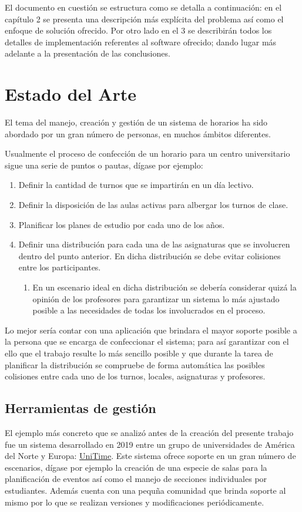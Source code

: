 El documento en cuestión se estructura como se detalla a continuación: en el capítulo 2 se presenta una descripción más explícita del problema así como el enfoque de solución ofrecido. Por otro lado en el 3 se describirán todos los detalles de implementación referentes al software ofrecido; dando lugar más adelante a la presentación de las conclusiones. 


\section{Estado del Arte}
El tema del manejo, creación y gestión de un sistema de horarios ha sido abordado por un gran número de personas, en muchos ámbitos diferentes.

Usualmente el proceso de confección de un horario para un centro universitario sigue una serie de puntos o pautas, dígase por ejemplo:
\begin{enumerate}
	\item Definir la cantidad de turnos que se impartirán en un día lectivo.
	\item Definir la disposición de las aulas activas para albergar los turnos de clase.
	\item Planificar los planes de estudio por cada uno de los años.
	\item Definir una distribución para cada una de las asignaturas que se involucren  dentro del punto anterior. En dicha distribución se debe evitar colisiones entre los participantes.
	\begin{enumerate}
		\item En un escenario ideal en dicha distribución se debería considerar quizá la opinión de los profesores para garantizar un sistema lo más ajustado posible a las necesidades de todas los involucrados en el proceso.
	\end{enumerate}
\end{enumerate}

Lo mejor sería contar con una aplicación que brindara el mayor soporte posible a la persona que se encarga de confeccionar el sistema; para así garantizar con el ello que el trabajo resulte lo más sencillo posible y que durante la tarea de planificar la distribución se compruebe de forma automática las posibles colisiones entre cada uno de los turnos, locales, asignaturas y profesores.

\subsection{Herramientas de gestión}
El ejemplo más concreto que se analizó antes de la creación del presente trabajo fue un sistema desarrollado en 2019 entre un grupo de universidades de América del Norte y Europa: \href{https://www.unitime.org/}{UniTime}\cite{UniTime}. Este sistema ofrece soporte en un gran número de escenarios, dígase por ejemplo la creación de una especie de salas para la planificación de eventos así como el manejo de secciones individuales por estudiantes. Además cuenta con una pequña comunidad que brinda soporte al mismo por lo que se realizan versiones y modificaciones periódicamente.

